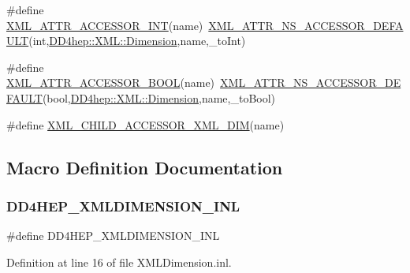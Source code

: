 \begin{DoxyCompactItemize}
\item 
\#define \hyperlink{_x_m_l_dimension_8inl_aa9f53a44681848d2aeda1c5cdac2efb8}{X\+M\+L\+\_\+\+A\+T\+T\+R\+\_\+\+A\+C\+C\+E\+S\+S\+O\+R\+\_\+\+I\+NT}(name)~\hyperlink{_x_m_l_dimension_8inl_a621d9cfc07f37e663ecb8f6c5bd22dfa}{X\+M\+L\+\_\+\+A\+T\+T\+R\+\_\+\+N\+S\+\_\+\+A\+C\+C\+E\+S\+S\+O\+R\+\_\+\+D\+E\+F\+A\+U\+LT}(int,\hyperlink{struct_d_d4hep_1_1_x_m_l_1_1_dimension}{D\+D4hep\+::\+X\+M\+L\+::\+Dimension},name,\+\_\+to\+Int)
\item 
\#define \hyperlink{_x_m_l_dimension_8inl_a8efa1be16815f59e7b049cab22c08a21}{X\+M\+L\+\_\+\+A\+T\+T\+R\+\_\+\+A\+C\+C\+E\+S\+S\+O\+R\+\_\+\+B\+O\+OL}(name)~\hyperlink{_x_m_l_dimension_8inl_a621d9cfc07f37e663ecb8f6c5bd22dfa}{X\+M\+L\+\_\+\+A\+T\+T\+R\+\_\+\+N\+S\+\_\+\+A\+C\+C\+E\+S\+S\+O\+R\+\_\+\+D\+E\+F\+A\+U\+LT}(bool,\hyperlink{struct_d_d4hep_1_1_x_m_l_1_1_dimension}{D\+D4hep\+::\+X\+M\+L\+::\+Dimension},name,\+\_\+to\+Bool)
\item 
\#define \hyperlink{_x_m_l_dimension_8inl_af3b6c67a307b3febcce9072bfcfd4d5e}{X\+M\+L\+\_\+\+C\+H\+I\+L\+D\+\_\+\+A\+C\+C\+E\+S\+S\+O\+R\+\_\+\+X\+M\+L\+\_\+\+D\+IM}(name)
\end{DoxyCompactItemize}


\subsection{Macro Definition Documentation}
\hypertarget{_x_m_l_dimension_8inl_ac453d10c915ef7f9fe1cda478fef8855}{}\label{_x_m_l_dimension_8inl_ac453d10c915ef7f9fe1cda478fef8855} 
\subsubsection{\texorpdfstring{D\+D4\+H\+E\+P\+\_\+\+X\+M\+L\+D\+I\+M\+E\+N\+S\+I\+O\+N\+\_\+\+I\+NL}{DD4HEP\_XMLDIMENSION\_INL}}
{\footnotesize\ttfamily \#define D\+D4\+H\+E\+P\+\_\+\+X\+M\+L\+D\+I\+M\+E\+N\+S\+I\+O\+N\+\_\+\+I\+NL}



Definition at line 16 of file X\+M\+L\+Dimension.\+inl.

\hypertarget{_x_m_l_dimension_8inl_accabcb0a0a37bcff066b1281c9814553}{}\label{_x_m_l_dimension_8inl_accabcb0a0a37bcff066b1281c9814553} 
